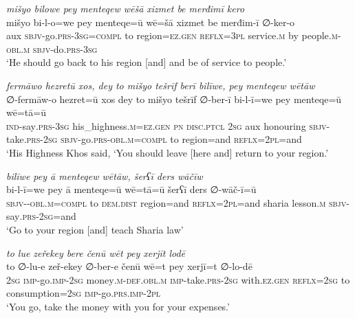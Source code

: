 \ea \label{ŽP.87}
\textit{mišyo bilowe pey menteqew wēšā xizmet be merđimī kero} \\ 
\gll mišyo bi-l-o=we pey menteqe=ū wē=šā xizmet be merđim-ī ∅-ker-o \\ 
 aux \textsc{sbjv-}go\textsc{.prs}\textsc{-3sg}\textsc{=compl} to region\textsc{\textsc{=ez.gen}} \textsc{reflx}\textsc{=3pl} service\textsc{.m} by people\textsc{.m}\textsc{-obl}\textsc{.m} \textsc{sbjv-}do\textsc{.prs}\textsc{-3sg} \\ 
\glt `He should go back to his region [and] and be of service to people.'
\z 
 
\ea \label{ŽP.91}
\textit{fermāwo hezretū xos, dey to mišyo tešrīf berī bilīwe, pey menteqew wētāw} \\ 
\gll ∅-fermāw-o hezret=ū xos dey to mišyo tešrīf ∅-ber-ī bi-l-ī=we pey menteqe=ū wē=tā=ū \\ 
 \textsc{ind-}say\textsc{.prs}\textsc{-3sg} his\_highness\textsc{.m}\textsc{\textsc{=ez.gen}} \textsc{pn} \textsc{disc.ptcl} \textsc{2sg} aux honouring \textsc{sbjv-}take\textsc{.prs}-\textsc{2sg} \textsc{sbjv-}go\textsc{.prs}\textsc{-obl}\textsc{.m}\textsc{=compl} to region=and \textsc{reflx}=\textsc{2pl}=and \\ 
\glt `His Highness Khos said, ‘You should leave [here and] return to your region.'
\z 
 
\ea \label{ŽP.93}
\textit{bilīwe pey ā menteqew wētāw, šerʕī ders wāčīw} \\ 
\gll bi-l-ī=we pey ā menteqe=ū wē=tā=ū šerʕī ders ∅-wāč-ī=ū \\ 
 \textsc{sbjv-}\textsc{-obl}\textsc{.m}\textsc{=compl} to \textsc{dem.dist} region=and \textsc{reflx}=\textsc{2pl}=and sharia lesson\textsc{.m} \textsc{sbjv-}say\textsc{.prs-}\textsc{2sg}=and \\ 
\glt `Go to your region [and] teach Sharia law'
\z 
 
\ea \label{ŽP.103}
\textit{to lue zeřekey bere čenū wēt pey xerjīt lodē} \\ 
\gll to ∅-lu-e zeř-ekey ∅-ber-e čenū wē=t pey xerjī=t ∅-lo-dē \\ 
 \textsc{2sg} \textsc{imp-}go.\textsc{imp-}\textsc{2sg} money\textsc{.m}\textsc{-def}\textsc{.obl}\textsc{.m} \textsc{imp-}take\textsc{.prs}-\textsc{2sg} with\textsc{.ez.gen} \textsc{reflx}\textsc{=\textsc{2sg}} to consumption\textsc{=\textsc{2sg}} \textsc{imp-}go\textsc{.prs}.\textsc{imp-}\textsc{2pl} \\ 
\glt `You go, take the money with you for your expenses.'
\z 
 
